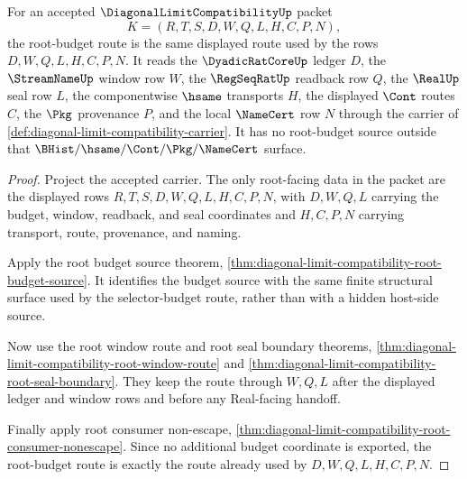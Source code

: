 \begin{theorem}
\label{thm:diagonal-limit-compatibility-root-budget-coherence}
For an accepted $\DiagonalLimitCompatibilityUp$ packet
$$
K=(R,T,S,D,W,Q,L,H,C,P,N),
$$
the root-budget route is the same displayed route used by the rows
$D,W,Q,L,H,C,P,N$. It reads the $\DyadicRatCoreUp$ ledger $D$, the
$\StreamNameUp$ window row $W$, the $\RegSeqRatUp$ readback row $Q$, the
$\RealUp$ seal row $L$, the componentwise $\hsame$ transports $H$, the
displayed $\Cont$ routes $C$, the $\Pkg$ provenance $P$, and the local
$\NameCert$ row $N$ through the carrier of
\autoref{def:diagonal-limit-compatibility-carrier}. It has no root-budget
source outside that $\BHist/\hsame/\Cont/\Pkg/\NameCert$ surface.
\end{theorem}
\begin{proof}
Project the accepted carrier. The only root-facing data in the packet are the
displayed rows $R,T,S,D,W,Q,L,H,C,P,N$, with $D,W,Q,L$ carrying the budget,
window, readback, and seal coordinates and $H,C,P,N$ carrying transport,
route, provenance, and naming.

Apply the root budget source theorem,
\autoref{thm:diagonal-limit-compatibility-root-budget-source}. It identifies
the budget source with the same finite structural surface used by the
selector-budget route, rather than with a hidden host-side source.

Now use the root window route and root seal boundary theorems,
\autoref{thm:diagonal-limit-compatibility-root-window-route} and
\autoref{thm:diagonal-limit-compatibility-root-seal-boundary}. They keep the
route through $W,Q,L$ after the displayed ledger and window rows and before
any Real-facing handoff.

Finally apply root consumer non-escape,
\autoref{thm:diagonal-limit-compatibility-root-consumer-nonescape}. Since no
additional budget coordinate is exported, the root-budget route is exactly
the route already used by $D,W,Q,L,H,C,P,N$.
\end{proof}

